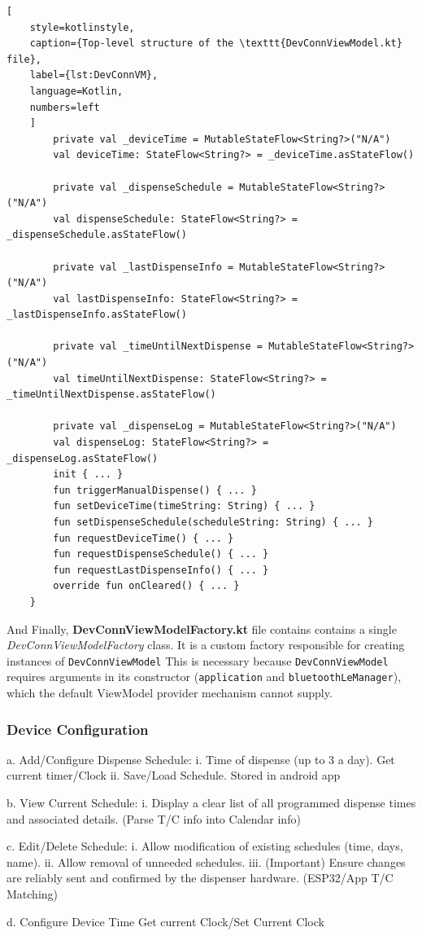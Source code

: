\begin{lstlisting}[
	style=kotlinstyle,
	caption={Top-level structure of the \texttt{DevConnViewModel.kt} file},
	label={lst:DevConnVM},
	language=Kotlin,
	numbers=left
	]
		private val _deviceTime = MutableStateFlow<String?>("N/A")
		val deviceTime: StateFlow<String?> = _deviceTime.asStateFlow()
		
		private val _dispenseSchedule = MutableStateFlow<String?>("N/A")
		val dispenseSchedule: StateFlow<String?> = _dispenseSchedule.asStateFlow()
		
		private val _lastDispenseInfo = MutableStateFlow<String?>("N/A")
		val lastDispenseInfo: StateFlow<String?> = _lastDispenseInfo.asStateFlow()
		
		private val _timeUntilNextDispense = MutableStateFlow<String?>("N/A")
		val timeUntilNextDispense: StateFlow<String?> = _timeUntilNextDispense.asStateFlow()
		
		private val _dispenseLog = MutableStateFlow<String?>("N/A")
		val dispenseLog: StateFlow<String?> = _dispenseLog.asStateFlow()
		init { ... }
		fun triggerManualDispense() { ... }
		fun setDeviceTime(timeString: String) { ... }
		fun setDispenseSchedule(scheduleString: String) { ... }
		fun requestDeviceTime() { ... }
		fun requestDispenseSchedule() { ... }
		fun requestLastDispenseInfo() { ... }
		override fun onCleared() { ... }
	}
\end{lstlisting}
And Finally, \textbf{DevConnViewModelFactory.kt} file contains contains a single \textit{DevConnViewModelFactory} class. It is a custom factory responsible for creating instances of \texttt{DevConnViewModel} This is necessary because \texttt{DevConnViewModel} requires arguments in its constructor (\texttt{application} and \texttt{bluetoothLeManager}), which the default ViewModel provider mechanism cannot supply.
\subsubsection{Device Configuration}
  a. Add/Configure Dispense Schedule:
  i. Time of dispense (up to 3 a day). Get current timer/Clock
  ii. Save/Load Schedule. Stored in android app
  
  b. View Current Schedule:
  i. Display a clear list of all programmed dispense times and associated details. (Parse T/C info into Calendar info)
  
  c. Edit/Delete Schedule:
  i. Allow modification of existing schedules (time, days, name).
  ii. Allow removal of unneeded schedules.
  iii. (Important) Ensure changes are reliably sent and confirmed by the dispenser hardware. (ESP32/App T/C Matching)
  
  d. Configure Device Time Get current Clock/Set Current Clock
  
